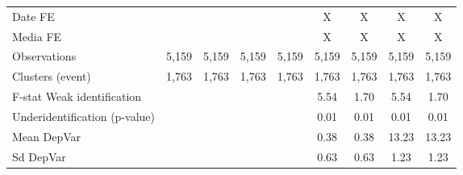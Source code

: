 {\begin{tabular}{l*{8}{c}}
\hline
Date FE             &                     &                     &                     &                     &           X         &           X         &           X         &           X         \\
Media FE            &                     &                     &                     &                     &           X         &           X         &           X         &           X         \\
Observations        &       5,159         &       5,159         &       5,159         &       5,159         &       5,159         &       5,159         &       5,159         &       5,159         \\
Clusters (event)    &       1,763         &       1,763         &       1,763         &       1,763         &       1,763         &       1,763         &       1,763         &       1,763         \\
F-stat Weak identification&                     &                     &                     &                     &        5.54         &        1.70         &        5.54         &        1.70         \\
Underidentification (p-value)&                     &                     &                     &                     &        0.01         &        0.01         &        0.01         &        0.01         \\
Mean DepVar         &                     &                     &                     &                     &        0.38         &        0.38         &       13.23         &       13.23         \\
Sd DepVar           &                     &                     &                     &                     &        0.63         &        0.63         &        1.23         &        1.23         \\
\hline\hline
\end{tabular}
}
